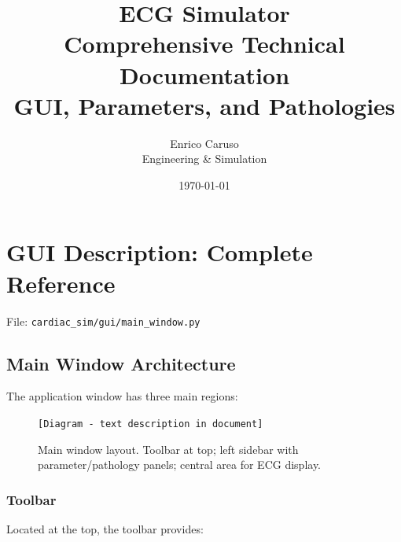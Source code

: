 \documentclass[12pt,a4paper,oneside]{book}
\title{\Large \textbf{ECG Simulator}\\
        \large Comprehensive Technical Documentation\\
        \normalsize GUI, Parameters, and Pathologies}
\author{Enrico Caruso\\Engineering \& Simulation}
\date{\today}
\begin{document}
\frontmatter

\tableofcontents
\listoffigures
\listoftables

\mainmatter

\chapter{GUI Description: Complete Reference}

File: \texttt{cardiac\_sim/gui/main\_window.py}

\section{Main Window Architecture}

The application window has three main regions:

\begin{figure}[H]
    \centering
    
    \begin{center}
    \texttt{[Diagram - text description in document]}
    \end{center}
    
    \caption{Main window layout. Toolbar at top; left sidebar with parameter/pathology panels; central area for ECG display.}
    \label{fig:main_window}
\end{figure}

\subsection{Toolbar}

Located at the top, the toolbar provides:
\end{document}
